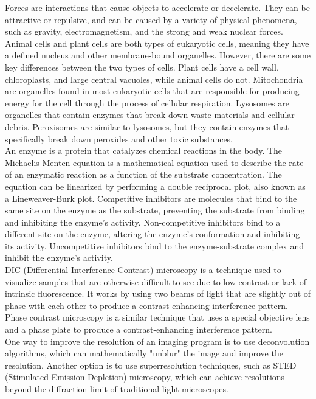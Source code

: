 \documentclass{article}
\begin{document}
Forces are interactions that cause objects to accelerate or decelerate. They can be attractive or repulsive, and can be caused by a variety of physical phenomena, such as gravity, electromagnetism, and the strong and weak nuclear forces.\\

Animal cells and plant cells are both types of eukaryotic cells, meaning they have a defined nucleus and other membrane-bound organelles. However, there are some key differences between the two types of cells. Plant cells have a cell wall, chloroplasts, and large central vacuoles, while animal cells do not. Mitochondria are organelles found in most eukaryotic cells that are responsible for producing energy for the cell through the process of cellular respiration. Lysosomes are organelles that contain enzymes that break down waste materials and cellular debris. Peroxisomes are similar to lysosomes, but they contain enzymes that specifically break down peroxides and other toxic substances.\\

An enzyme is a protein that catalyzes chemical reactions in the body. The Michaelis-Menten equation is a mathematical equation used to describe the rate of an enzymatic reaction as a function of the substrate concentration. The equation can be linearized by performing a double reciprocal plot, also known as a Lineweaver-Burk plot. Competitive inhibitors are molecules that bind to the same site on the enzyme as the substrate, preventing the substrate from binding and inhibiting the enzyme's activity. Non-competitive inhibitors bind to a different site on the enzyme, altering the enzyme's conformation and inhibiting its activity. Uncompetitive inhibitors bind to the enzyme-substrate complex and inhibit the enzyme's activity.\\

DIC (Differential Interference Contrast) microscopy is a technique used to visualize samples that are otherwise difficult to see due to low contrast or lack of intrinsic fluorescence. It works by using two beams of light that are slightly out of phase with each other to produce a contrast-enhancing interference pattern. Phase contrast microscopy is a similar technique that uses a special objective lens and a phase plate to produce a contrast-enhancing interference pattern.\\

One way to improve the resolution of an imaging program is to use deconvolution algorithms, which can mathematically "unblur" the image and improve the resolution. Another option is to use superresolution techniques, such as STED (Stimulated Emission Depletion) microscopy, which can achieve resolutions beyond the diffraction limit of traditional light microscopes.\\
\end{document}
